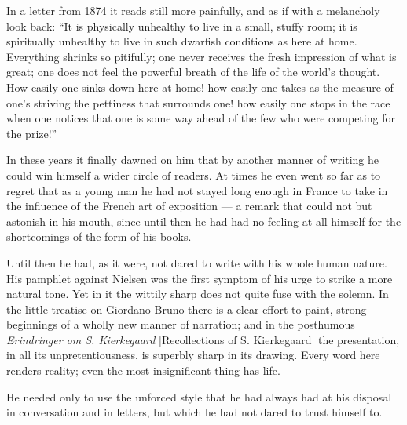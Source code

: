 \documentclass[12pt,a4paper,openany]{book}
\newcommand{\opage}[1]{\marginnote{\footnotesize\textit{[#1]}}}
\begin{document}
In a letter from 1874 it reads still more painfully, and as if with a
melancholy look back: ``It is physically unhealthy to live in a small, stuffy
room; it is spiritually unhealthy to live in such dwarfish conditions as here
at home. Everything shrinks so pitifully; one never receives the fresh
impression of what is great; one does not feel
\opage{249}the powerful breath of the life of the world's thought. How easily one sinks
down here at home! how easily one takes as the measure of one's striving the
pettiness that surrounds one! how easily one stops in the race when one
notices that one is some way ahead of the few who were competing for the
prize!''

In these years it finally dawned on him that by another manner of writing he
could win himself a wider circle of readers. At times he even went so far as to
regret that as a young man he had not stayed long enough in France to take in
the influence of the French art of exposition --- a remark that could not but
astonish in his mouth, since until then he had had no feeling at all himself
for the shortcomings of the form of his books.

Until then he had, as it were, not dared to write with his whole human nature.
His pamphlet against Nielsen was the first symptom of his urge to strike a more
natural tone. Yet in it the wittily sharp does not quite fuse with the solemn.
In the little treatise on Giordano Bruno there is a clear effort to paint,
strong beginnings of a wholly new manner of narration; and in the posthumous
\textit{Erindringer om S. Kierkegaard} [Recollections of S. Kierkegaard] the
presentation, in all its unpretentiousness, is superbly sharp in its drawing.
\opage{250}Every word here renders reality; even the most insignificant thing has life.

He needed only to use the unforced style that he had always had at his
disposal in conversation and in letters, but which he had not dared to trust
himself to.
\end{document}
